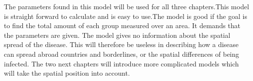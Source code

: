 \documentclass[%
twoside,                 %
final,                   %
chapterprefix=true,      %
open=right               %
10pt]{book}
\newcommand{\clearemptydoublepage}{\clearpage{\pagestyle{empty}\cleardoublepage}}
\begin{document}
\vspace{3mm}


The parameters found in this model will be used for all three chapters.This model is straight forward to calculate and is easy to use.The model is good if the goal is to find the total amount of each group measured over an area. It demands that the parameters are given. The model gives no information about the spatial spread of the disease. This will therefore be useless in describing how a disease can spread abroad countries and borderlines, or the spatial differences of being infected. The two next chapters will introduce more complicated models which will take the spatial position into account. 



\clearemptydoublepage
{}
\thispagestyle{empty}








\clearemptydoublepage
{}
\thispagestyle{empty}
\printindex
\end{document}
